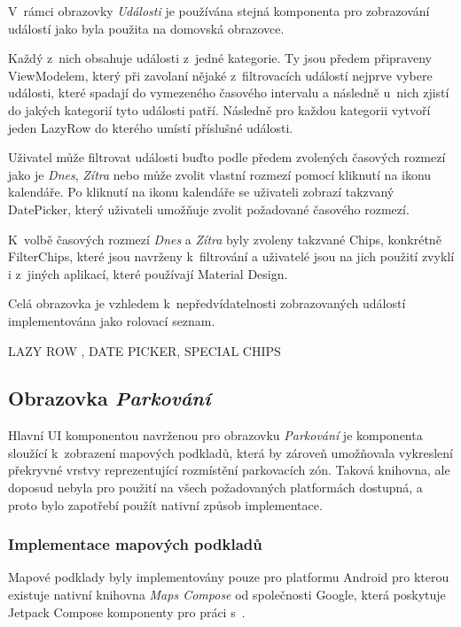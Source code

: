 V~rámci obrazovky \textit{Události} je používána stejná komponenta pro zobrazování událostí jako byla použita na domovská obrazovce. 


Každý z~nich obsahuje události z~jedné kategorie. Ty jsou předem připraveny ViewModelem, který při zavolaní nějaké z~filtrovacích
událostí nejprve vybere události, které spadají do vymezeného časového intervalu a následně u~nich zjistí do jakých kategorií tyto
události patří. Následně pro každou kategorii vytvoří jeden LazyRow do kterého umístí příslušné události.

Uživatel může filtrovat události buďto podle předem zvolených časových rozmezí jako je \textit{Dnes}, \textit{Zítra} nebo může zvolit vlastní 
rozmezí pomocí kliknutí na ikonu kalendáře. Po kliknutí na ikonu kalendáře se uživateli zobrazí takzvaný DatePicker, který 
uživateli umožňuje zvolit požadované časového rozmezí.

K~volbě časových rozmezí \textit{Dnes} a \textit{Zítra} byly zvoleny takzvané Chips, konkrétně FilterChips, které jsou navrženy
k~filtrování a uživatelé jsou na jich použití zvyklí i z~jiných aplikací, které používají Material Design.

Celá obrazovka je vzhledem k~nepředvídatelnosti zobrazovaných událostí implementována jako rolovací seznam.

LAZY ROW , DATE PICKER, SPECIAL CHIPS


\subsection{Obrazovka \textit{Parkování}} \label{parkingScreenImpl}
Hlavní UI komponentou navrženou pro obrazovku \textit{Parkování} je komponenta sloužící k~zobrazení mapových podkladů, která by zároveň umožňovala 
vykreslení překryvné vrstvy reprezentující rozmístění parkovacích zón. Taková knihovna, ale doposud nebyla pro použití na všech požadovaných 
platformách dostupná, a proto bylo zapotřebí použít nativní způsob implementace. 

\subsubsection*{Implementace mapových podkladů}
Mapové podklady byly implementovány pouze pro platformu Android pro kterou existuje nativní knihovna \textit{Maps Compose} od společnosti Google, 
která poskytuje Jetpack Compose komponenty pro práci s~.

